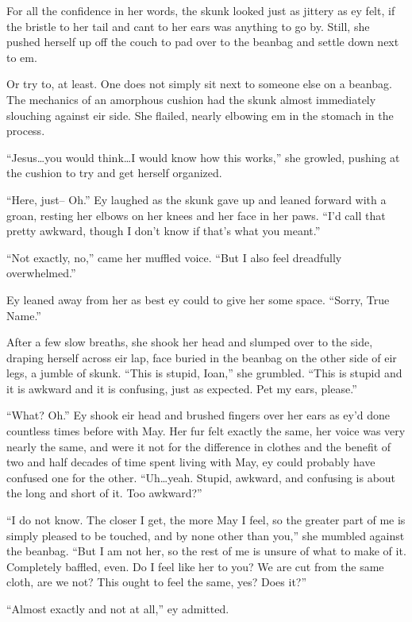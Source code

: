 For all the confidence in her words, the skunk looked just as jittery as ey felt, if the bristle to her tail and cant to her ears was anything to go by. Still, she pushed herself up off the couch to pad over to the beanbag and settle down next to em.

Or try to, at least. One does not simply sit next to someone else on a beanbag. The mechanics of an amorphous cushion had the skunk almost immediately slouching against eir side. She flailed, nearly elbowing em in the stomach in the process.

``Jesus\ldots you would think\ldots I would know how this works,'' she growled, pushing at the cushion to try and get herself organized.

``Here, just-- Oh.'' Ey laughed as the skunk gave up and leaned forward with a groan, resting her elbows on her knees and her face in her paws. ``I'd call that pretty awkward, though I don't know if that's what you meant.''

``Not exactly, no,'' came her muffled voice. ``But I also feel dreadfully overwhelmed.''

Ey leaned away from her as best ey could to give her some space. ``Sorry, True Name.''

After a few slow breaths, she shook her head and slumped over to the side, draping herself across eir lap, face buried in the beanbag on the other side of eir legs, a jumble of skunk. ``This is stupid, Ioan,'' she grumbled. ``This is stupid and it is awkward and it is confusing, just as expected. Pet my ears, please.''

``What? Oh.'' Ey shook eir head and brushed fingers over her ears as ey'd done countless times before with May. Her fur felt exactly the same, her voice was very nearly the same, and were it not for the difference in clothes and the benefit of two and half decades of time spent living with May, ey could probably have confused one for the other. ``Uh\ldots yeah. Stupid, awkward, and confusing is about the long and short of it. Too awkward?''

``I do not know. The closer I get, the more May I feel, so the greater part of me is simply pleased to be touched, and by none other than you,'' she mumbled against the beanbag. ``But I am not her, so the rest of me is unsure of what to make of it. Completely baffled, even. Do I feel like her to you? We are cut from the same cloth, are we not? This ought to feel the same, yes? Does it?''

``Almost exactly and not at all,'' ey admitted.

